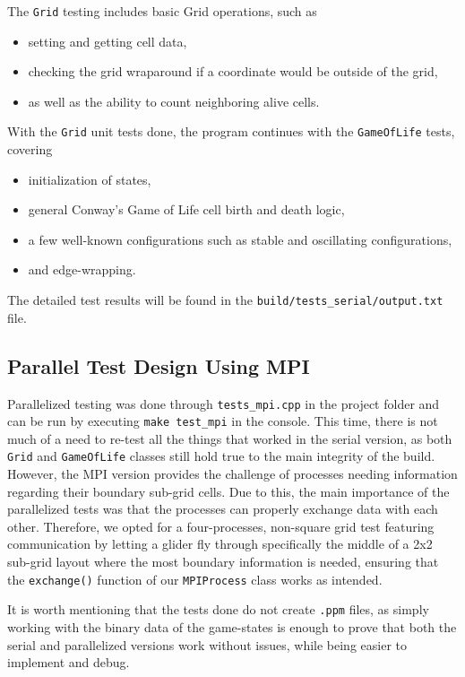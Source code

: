 \documentclass[11pt]{article}
\begin{document}
The \texttt{Grid} testing includes basic Grid operations, such as 
\begin{itemize}
    \item setting and getting cell data,
    \item checking the grid wraparound if a coordinate would be outside of the grid,
    \item as well as the ability to count neighboring alive cells.
\end{itemize}

With the \texttt{Grid} unit tests done, the program continues with the \texttt{GameOfLife} tests, covering
\begin{itemize}
    \item initialization of states,
    \item general Conway’s Game of Life cell birth and death logic,
    \item a few well-known configurations such as stable and oscillating configurations,
    \item and edge-wrapping.
\end{itemize}

The detailed test results will be found in the \texttt{build/tests\_serial/output.txt} file.

\subsection{Parallel Test Design Using MPI}
Parallelized testing was done through \texttt{tests\_mpi.cpp} in the project folder and can be run by executing \texttt{make test\_mpi} in the console. This time, there is not much of a need to re-test all the things that worked in the serial version, as both \texttt{Grid} and \texttt{GameOfLife} classes still hold true to the main integrity of the build. However, the MPI version provides the challenge of processes needing information regarding their boundary sub-grid cells. Due to this, the main importance of the parallelized tests was that the processes can properly exchange data with each other. Therefore, we opted for a four-processes, non-square grid test featuring communication by letting a glider fly through specifically the middle of a 2x2 sub-grid layout where the most boundary information is needed, ensuring that the \texttt{exchange()} function of our \texttt{MPIProcess} class works as intended. 

It is worth mentioning that the tests done do not create \texttt{.ppm} files, as simply working with the binary data of the game-states is enough to prove that both the serial and parallelized versions work without issues, while being easier to implement and debug.
\end{document}
